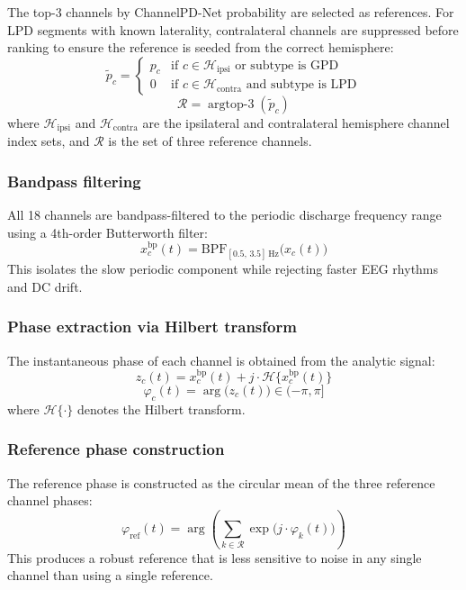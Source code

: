 The top-3 channels by ChannelPD-Net probability are selected as references. For LPD segments with known laterality, contralateral channels are suppressed before ranking to ensure the reference is seeded from the correct hemisphere:
\[ \tilde{p}_c = \begin{cases} p_c & \text{if } c \in \mathcal{H}_{\mathrm{ipsi}} \text{ or subtype is GPD} \\ 0 & \text{if } c \in \mathcal{H}_{\mathrm{contra}} \text{ and subtype is LPD} \end{cases} \tag{1} \]
\[ \mathcal{R} = \operatorname{argtop\text{-}3}(\tilde{p}_c) \tag{2} \]
where $\mathcal{H}_{\mathrm{ipsi}}$ and $\mathcal{H}_{\mathrm{contra}}$ are the ipsilateral and contralateral hemisphere channel index sets, and $\mathcal{R}$ is the set of three reference channels.

\subsubsection{Bandpass filtering}

All 18 channels are bandpass-filtered to the periodic discharge frequency range using a 4th-order Butterworth filter:
\[ x_c^{\mathrm{bp}}(t) = \mathrm{BPF}_{[0.5,\, 3.5]\,\text{Hz}}\!\big(x_c(t)\big) \tag{3} \]
This isolates the slow periodic component while rejecting faster EEG rhythms and DC drift.

\subsubsection{Phase extraction via Hilbert transform}

The instantaneous phase of each channel is obtained from the analytic signal:
\[ z_c(t) = x_c^{\mathrm{bp}}(t) + j \cdot \mathcal{H}\!\big\{x_c^{\mathrm{bp}}(t)\big\} \tag{4} \]
\[ \varphi_c(t) = \arg\!\big(z_c(t)\big) \in (-\pi, \pi] \tag{5} \]
where $\mathcal{H}\{\cdot\}$ denotes the Hilbert transform.

\subsubsection{Reference phase construction}

The reference phase is constructed as the circular mean of the three reference channel phases:
\[ \varphi_{\mathrm{ref}}(t) = \arg\!\left(\sum_{k \in \mathcal{R}} \exp\!\big(j \cdot \varphi_k(t)\big)\right) \tag{6} \]
This produces a robust reference that is less sensitive to noise in any single channel than using a single reference.

